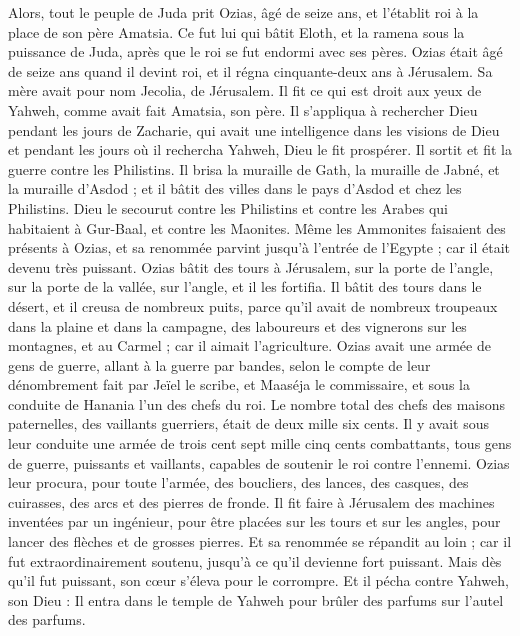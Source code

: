 \begin{multicols}{2}
\VerseOne{}Alors, tout le peuple de Juda prit Ozias, âgé de seize ans, et l'établit roi à la place de son père Amatsia.
Ce fut lui qui bâtit Eloth, et la ramena sous la puissance de Juda, après que le roi se fut endormi avec ses pères.
Ozias était âgé de seize ans quand il devint roi, et il régna cinquante-deux ans à Jérusalem. Sa mère avait pour nom Jecolia, de Jérusalem.
Il fit ce qui est droit aux yeux de Yahweh, comme avait fait Amatsia, son père.
Il s'appliqua à rechercher Dieu pendant les jours de Zacharie, qui avait une intelligence dans les visions de Dieu et pendant les jours où il rechercha Yahweh, Dieu le fit prospérer.
Il sortit et fit la guerre contre les Philistins. Il brisa la muraille de Gath, la muraille de Jabné, et la muraille d'Asdod ; et il bâtit des villes dans le pays d'Asdod et chez les Philistins.
Dieu le secourut contre les Philistins et contre les Arabes qui habitaient à Gur-Baal, et contre les Maonites.
Même les Ammonites faisaient des présents à Ozias, et sa renommée parvint jusqu'à l'entrée de l'Egypte ; car il était devenu très puissant.
Ozias bâtit des tours à Jérusalem, sur la porte de l'angle, sur la porte de la vallée, sur l'angle, et il les fortifia.
Il bâtit des tours dans le désert, et il creusa de nombreux puits, parce qu'il avait de nombreux troupeaux dans la plaine et dans la campagne, des laboureurs et des vignerons sur les montagnes, et au Carmel ; car il aimait l'agriculture.
Ozias avait une armée de gens de guerre, allant à la guerre par bandes, selon le compte de leur dénombrement fait par Jeïel le scribe, et Maaséja le commissaire, et sous la conduite de Hanania l'un des chefs du roi.
Le nombre total des chefs des maisons paternelles, des vaillants guerriers, était de deux mille six cents.
Il y avait sous leur conduite une armée de trois cent sept mille cinq cents combattants, tous gens de guerre, puissants et vaillants, capables de soutenir le roi contre l'ennemi.
Ozias leur procura, pour toute l'armée, des boucliers, des lances, des casques, des cuirasses, des arcs et des pierres de fronde.
Il fit faire à Jérusalem des machines inventées par un ingénieur, pour être placées sur les tours et sur les angles, pour lancer des flèches et de grosses pierres. Et sa renommée se répandit au loin ; car il fut extraordinairement soutenu, jusqu'à ce qu'il devienne fort puissant.
Mais dès qu'il fut puissant, son cœur s'éleva pour le corrompre. Et il pécha contre Yahweh, son Dieu : Il entra dans le temple de Yahweh pour brûler des parfums sur l'autel des parfums.

\end{multicols}
